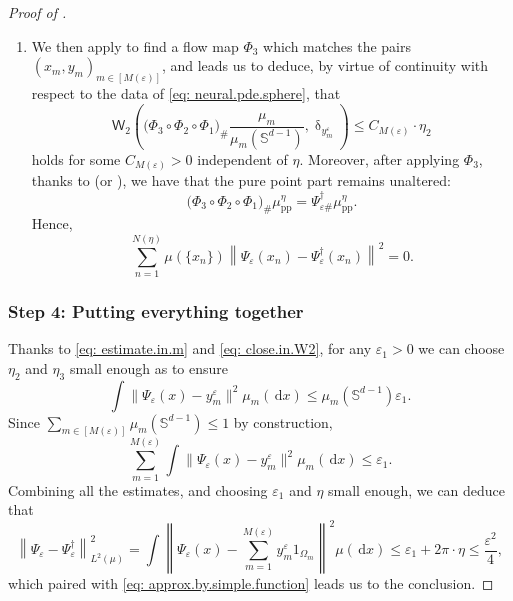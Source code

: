 \documentclass[a4paper,11pt]{article}
\theoremstyle{plain}
\newcommand{\diff}{\, \mathrm{d}}
\renewcommand{\S}{\mathbb{S}^{d-1}}
\renewcommand{\leq}{\leqslant}
\numberwithin{equation}{section}
\begin{document}
\begin{proof}[Proof of ]
\begin{enumerate}
\item  We then apply  to find a flow map $\Phi_3$ which matches the pairs $(x_m,y_m)_{m\in[M(\varepsilon)]}$, and leads us to deduce, by virtue of continuity with respect to the data of \eqref{eq: neural.pde.sphere}, that
\begin{equation}\label{eq: close.in.W2}
\mathsf{W}_2\left(\Big(\Phi_3\circ\Phi_2\circ\Phi_1\Big)_{\#}\frac{\mu_m}{\mu_m(\S)}  ,\updelta_{y_m^\varepsilon}\right)\leq C_{M(\varepsilon)}\cdot \eta_2
\end{equation}
holds for some $C_{M(\varepsilon)}>0$ independent of $\eta$. Moreover, after applying $\Phi_3$, thanks to  (or ), we have that the pure point part remains unaltered:
\begin{equation*}
    \Big(\Phi_3\circ\Phi_2\circ\Phi_1\Big)_\# \mu^\eta_{\text{pp}} =\Psi^\dagger_{\varepsilon\#}\mu^\eta_{\text{pp}}.
\end{equation*}
Hence,
\begin{equation*}
    \sum_{n=1}^{N(\eta)} \mu(\{x_n\})\left\|\Psi_\varepsilon(x_n)-\Psi^\dagger_\varepsilon(x_n)\right\|^2=0.
\end{equation*}


\end{enumerate}

 \subsubsection*{Step 4: Putting everything together}
 Thanks to \eqref{eq: estimate.in.m} and \eqref{eq: close.in.W2}, for any $\varepsilon_1>0$ we can choose $\eta_2$ and $\eta_3$ small enough as to ensure
\begin{equation*}
    \int\|\Psi_\varepsilon(x)-y_m^\varepsilon\|^2\mu_m(\diff x)\leq\mu_m(\S)\varepsilon_1.
\end{equation*}
Since $\sum_{m\in[M(\varepsilon)]} \mu_m(\S)\leq 1$ by construction,
\begin{equation*}
    \sum_{m=1}^{M(\varepsilon)} \int\|\Psi_\varepsilon(x)-y_m^\varepsilon\|^2\mu_m(\diff x)\leq \varepsilon_1.
\end{equation*}
Combining all the estimates, and choosing $\varepsilon_1$ and $\eta$ small enough, we can deduce that
\begin{equation*}
    \left\|\Psi_\varepsilon-\Psi^\dagger_\varepsilon\right\|^2_{L^2(\mu)}=\int\left\|\Psi_\varepsilon(x)-\sum_{m=1}^{M(\varepsilon)}y_m^\varepsilon1_{\Omega_m}\right\|^2\mu(\diff x)\leq \varepsilon_1+2\pi\cdot\eta\leq\frac{\varepsilon^2}{4},
\end{equation*}
which paired with \eqref{eq: approx.by.simple.function} leads us to the conclusion.
\end{proof}
\end{document}
